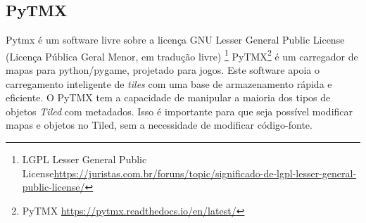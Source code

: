 


\subsection{PyTMX}
\label{sec:pytmx}
Pytmx é um software livre sobre a licença GNU Lesser General Public License (Licença Pública Geral Menor, em tradução livre) \footnote{LGPL Lesser General Public License\url{https://juristas.com.br/foruns/topic/significado-de-lgpl-lesser-general-public-license/}}
PyTMX\footnote{PyTMX \url{https://pytmx.readthedocs.io/en/latest/}} é um carregador de mapas para python/pygame, projetado para jogos. Este software apoia o carregamento inteligente de \textit{tiles} com uma base de armazenamento rápida e eficiente. O PyTMX tem a capacidade de manipular a maioria dos tipos de objetos \textit{Tiled} com metadados. Isso é importante para que seja possível modificar mapas e objetos no Tiled, sem a necessidade de modificar código-fonte.






